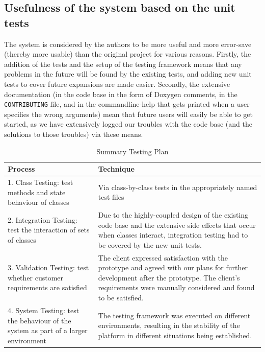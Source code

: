 \documentclass[11pt,a4paper]{article}
\begin{document}
\subsection{Usefulness of the system based on the unit tests}
The system is considered by the authors to be more useful and more error-save
(thereby more usable) than the original project for various reasons. Firstly,
the addition of the tests and the setup of the testing framework means that any
problems in the future will be found by the existing tests, and adding new unit
tests to cover future expansions are made easier. Secondly, the extensive
documentation (in the code base in the form of Doxygen comments, in the
\texttt{CONTRIBUTING} file, and in the commandline-help that gets printed when
a user specifies the wrong arguments) mean that future users will easily be
able to get started, as we have extensively logged our troubles with the code
base (and the solutions to those troubles) via these means.

\begin{table}[h!]
    \centering
    \caption{Summary Testing Plan}
    \begin{tabular}[t]{|p{8cm}|p{7cm}|} \hline
        \textbf{Process} & \textbf{Technique} \\
        \hline 1. Class Testing: test methods and state behaviour of classes
                         & Via class-by-class tests in the appropriately named
                         test files\\
        \hline 2. Integration Testing: test the interaction of sets of classes
                            & Due to the highly-coupled design of the existing
                            code base and the extensive side effects that occur when
                            classes interact, integration testing had to be
                            covered by the new unit tests.\\
        \hline 3. Validation Testing: test whether customer requirements are
        satisfied
                            & The client expressed satisfaction with the
                            prototype and agreed with our plans for further
                            development after the prototype. The client's
                            requirements were manually considered and found to
                            be satisfied.\\
        \hline 4. System Testing: test the behaviour of the system as part of a
        larger environment
                            &  The testing framework was executed on different
                            environments, resulting in the stability of the
                            platform in different situations being established.\\
        \hline
    \end{tabular}
    \label{tab:test-plan}
\end{table}
\end{document}
